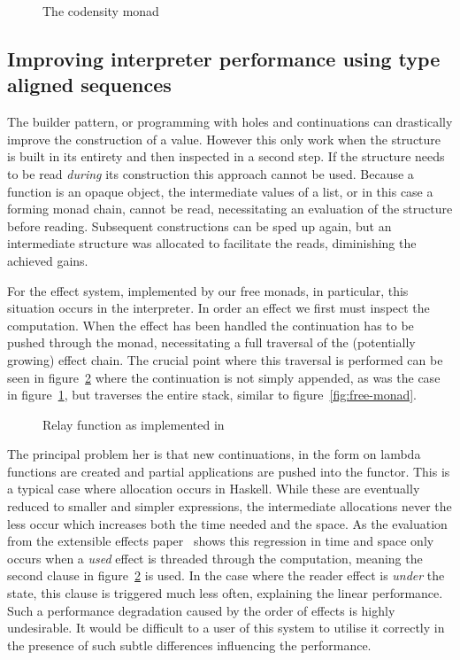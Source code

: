 \begin{figure}
  
  \caption{The codensity monad}
  \label{fig:codensity-monad}
\end{figure}

\subsection{Improving interpreter performance using type aligned sequences}

\label{sec:type-aligned-sequence}

The builder pattern, or programming with holes and continuations can drastically
improve the construction of a value. However this only work when the structure
is built in its entirety and then inspected in a second step. If the structure
needs to be read \emph{during} its construction this approach cannot be used.
Because a function is an opaque object, the intermediate values of a list, or in
this case a forming monad chain, cannot be read, necessitating an evaluation of
the structure before reading. Subsequent constructions can be sped up again, but
an intermediate structure was allocated to facilitate the reads, diminishing the
achieved gains.

For the effect system, implemented by our free monads, in particular, this
situation occurs in the interpreter. In order an effect we first must inspect
the computation. When the effect has been handled the continuation has to be
pushed through the monad, necessitating a full traversal of the (potentially
growing) effect chain. The crucial point where this traversal is performed can
be seen in figure~\ref{fig:ee-handle-relay} where the continuation is not simply
appended, as was the case in figure~\ref{fig:codensity-monad}, but traverses the
entire stack, similar to figure~\ref{fig:free-monad}.

\begin{figure}
  
  \caption{Relay function as implemented in~\cite{extensible-effects}}
  \label{fig:ee-handle-relay}
\end{figure}

The principal problem her is that new continuations, in the form on lambda
functions are created and partial applications are pushed into the functor. This
is a typical case where allocation occurs in Haskell. While these are eventually
reduced to smaller and simpler expressions, the intermediate allocations never
the less occur which increases both the time needed and the space. As the
evaluation from the extensible effects paper~\cite{freer} shows this regression
in time and space only occurs when a \emph{used} effect is threaded through the
computation, meaning the second clause in figure~\ref{fig:ee-handle-relay} is
used. In the case where the reader effect is \emph{under} the state, this clause
is triggered much less often, explaining the linear performance. Such a
performance degradation caused by the order of effects is highly undesirable. It
would be difficult to a user of this system to utilise it correctly in the
presence of such subtle differences influencing the performance.

